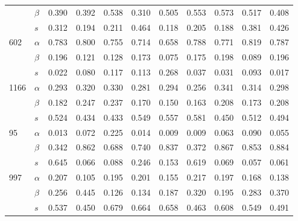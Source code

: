 \begin{longtable}{llrrrrrrrrr}
     & $\beta$ & 0.390 & 0.392 & 0.538 & 0.310 & 0.505 & 0.553 & 0.573 & 0.517 & 0.408 \\
     & $s$ & 0.312 & 0.194 & 0.211 & 0.464 & 0.118 & 0.205 & 0.188 & 0.381 & 0.426 \\
\cline{1-11}
\multirow{3}{*}{602} & $\alpha$ & 0.783 & 0.800 & 0.755 & 0.714 & 0.658 & 0.788 & 0.771 & 0.819 & 0.787 \\
     & $\beta$ & 0.196 & 0.121 & 0.128 & 0.173 & 0.075 & 0.175 & 0.198 & 0.089 & 0.196 \\
     & $s$ & 0.022 & 0.080 & 0.117 & 0.113 & 0.268 & 0.037 & 0.031 & 0.093 & 0.017 \\
\cline{1-11}
\multirow{3}{*}{1166} & $\alpha$ & 0.293 & 0.320 & 0.330 & 0.281 & 0.294 & 0.256 & 0.341 & 0.314 & 0.298 \\
     & $\beta$ & 0.182 & 0.247 & 0.237 & 0.170 & 0.150 & 0.163 & 0.208 & 0.173 & 0.208 \\
     & $s$ & 0.524 & 0.434 & 0.433 & 0.549 & 0.557 & 0.581 & 0.450 & 0.512 & 0.494 \\
\cline{1-11}
\multirow{3}{*}{95} & $\alpha$ & 0.013 & 0.072 & 0.225 & 0.014 & 0.009 & 0.009 & 0.063 & 0.090 & 0.055 \\
     & $\beta$ & 0.342 & 0.862 & 0.688 & 0.740 & 0.837 & 0.372 & 0.867 & 0.853 & 0.884 \\
     & $s$ & 0.645 & 0.066 & 0.088 & 0.246 & 0.153 & 0.619 & 0.069 & 0.057 & 0.061 \\
\cline{1-11}
\multirow{3}{*}{997} & $\alpha$ & 0.207 & 0.105 & 0.195 & 0.201 & 0.155 & 0.217 & 0.197 & 0.168 & 0.138 \\
     & $\beta$ & 0.256 & 0.445 & 0.126 & 0.134 & 0.187 & 0.320 & 0.195 & 0.283 & 0.370 \\
     & $s$ & 0.537 & 0.450 & 0.679 & 0.664 & 0.658 & 0.463 & 0.608 & 0.549 & 0.491 \\
\end{longtable}
